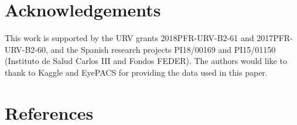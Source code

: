 \documentclass[review]{elsarticle}
\theoremstyle{definition} %
\theoremstyle{remark}
\begin{document}
\section*{Acknowledgements}

This work is supported by the URV grants 2018PFR-URV-B2-61 and 2017PFR-URV-B2-60, and the Spanish research projects PI18/00169 and PI15/01150 (Instituto de Salud Carlos III and Fondos FEDER). The authors would like to thank to Kaggle and EyePACS for providing the data used in this paper.

\section*{References}


\end{document}
